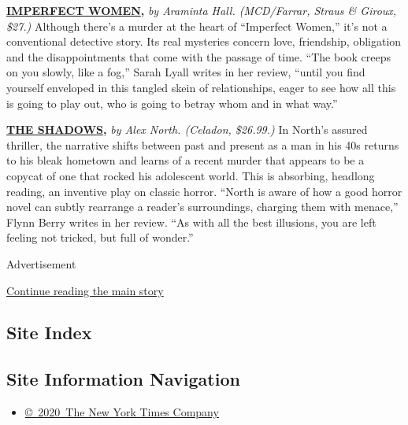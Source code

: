 \href{https://www.nytimes3xbfgragh.onion/2020/07/24/books/review/araminta-hall-imperfect-women.html}{\textbf{\textbf{IMPERFECT
WOMEN}}}\textbf{\textbf{,}} \emph{by Araminta Hall. (MCD/Farrar, Straus
\& Giroux, \$27.)} Although there's a murder at the heart of ``Imperfect
Women,'' it's not a conventional detective story. Its real mysteries
concern love, friendship, obligation and the disappointments that come
with the passage of time. ``The book creeps on you slowly, like a fog,''
Sarah Lyall writes in her review, ``until you find yourself enveloped in
this tangled skein of relationships, eager to see how all this is going
to play out, who is going to betray whom and in what way.''

\href{https://www.nytimes3xbfgragh.onion/2020/07/07/books/review/the-shadows-alex-north.html}{\textbf{\textbf{THE
SHADOWS}}}\textbf{\textbf{,}} \emph{by Alex North. (Celadon, \$26.99.)}
In North's assured thriller, the narrative shifts between past and
present as a man in his 40s returns to his bleak hometown and learns of
a recent murder that appears to be a copycat of one that rocked his
adolescent world. This is absorbing, headlong reading, an inventive play
on classic horror. ``North is aware of how a good horror novel can
subtly rearrange a reader's surroundings, charging them with menace,''
Flynn Berry writes in her review. ``As with all the best illusions, you
are left feeling not tricked, but full of wonder.''

Advertisement

\protect\hyperlink{after-bottom}{Continue reading the main story}

\hypertarget{site-index}{%
\subsection{Site Index}\label{site-index}}

\hypertarget{site-information-navigation}{%
\subsection{Site Information
Navigation}\label{site-information-navigation}}

\begin{itemize}
\tightlist
\item
  \href{https://help.nytimes3xbfgragh.onion/hc/en-us/articles/115014792127-Copyright-notice}{©~2020~The
  New York Times Company}
\end{itemize}

